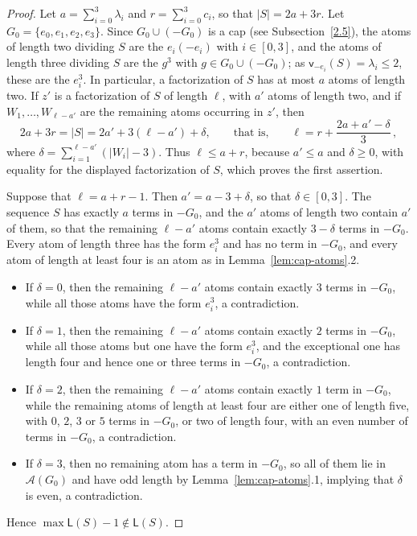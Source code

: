\documentclass[a4paper, 10pt]{amsart}
\theoremstyle{plain}
\theoremstyle{definition}
\theoremstyle{definition}
\numberwithin{equation}{section}
\begin{document}
\begin{proof}
Let $a = \sum_{i=0}^3 \lambda_i$ and $r = \sum_{i=0}^3 c_i$, so that
$|S| = 2a+3r$. Let $G_0=\{e_0,e_1,e_2,e_3\}$. Since $G_0 \cup (-G_0)$ is a cap (see Subsection~\ref{2.5}), the atoms of length two
dividing $S$ are the $e_i(-e_i)$ with $i \in [0,3]$, and the atoms of length
three dividing $S$ are the $g^3$ with $g \in G_0 \cup (-G_0)$; as
$\mathsf v_{-e_i}(S) = \lambda_i \le 2$, these are the $e_i^3$.  In
particular, a factorization of $S$ has at most $a$ atoms of length two.  If
$z'$ is a factorization of $S$ of length $\ell$, with $a'$ atoms of length
two, and if $W_1,\ldots,W_{\ell-a'}$ are the remaining atoms occurring in $z'$, then
\[
 2a+3r = |S| = 2a' + 3(\ell - a') + \delta ,
 \qquad\text{that is,}\qquad
 \ell = r + \frac{2a + a'-\delta}{3}\,,
\]
where $\delta=\sum_{i=1}^{\ell-a'}(|W_i|-3)$.
Thus $\ell \le a+r$, because $a' \le a$ and $\delta \ge 0$, with equality for the displayed factorization of $S$,
which proves the first assertion.

Suppose that $\ell = a+r-1$.  Then $a' = a-3+\delta$, so that
$\delta \in [0,3]$.  The sequence $S$ has exactly $a$ terms in $-G_0$, and the
$a'$ atoms of length two contain $a'$ of them, so that the remaining $\ell-a'$
atoms contain exactly $3-\delta$ terms in $-G_0$.  Every atom of
length three has the form $e_i^3$ and has no term in $-G_0$, and every atom of
length at least four is an atom as in Lemma~\ref{lem:cap-atoms}.2.
\begin{itemize}
\item If $\delta = 0$, then the remaining $\ell-a'$
atoms contain exactly $3$ terms in $-G_0$, while all those atoms have the form $e_i^3$, a contradiction.
\item If $\delta = 1$, then the remaining $\ell-a'$
atoms contain exactly $2$ terms in $-G_0$, while all those atoms but one have the form $e_i^3$, and the
      exceptional one has length four and hence one or three terms in $-G_0$,
      a contradiction.
\item If $\delta = 2$, then the remaining $\ell-a'$
atoms contain exactly $1$ term in $-G_0$, while the remaining atoms of length at least four are
      either one of length five, with $0$, $2$, $3$ or $5$ terms in $-G_0$, or
      two of length four, with an even number of terms in $-G_0$, a contradiction.
\item If $\delta = 3$, then no remaining atom has a term in $-G_0$, so all of
      them lie in $\mathcal A (G_0)$ and have odd length by
      Lemma~\ref{lem:cap-atoms}.1, implying that $\delta$ is even, a contradiction.
\end{itemize}
Hence $\max\mathsf L(S)-1 \notin \mathsf L(S)$.
\end{proof}
\end{document}
